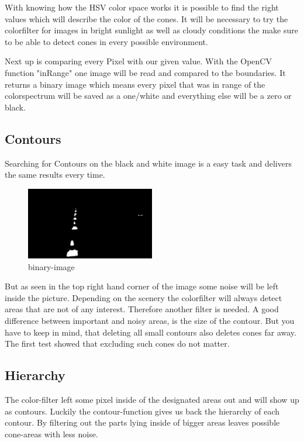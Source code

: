 \documentclass[10pt,a4paper]{article}
\begin{document}
	With knowing how the HSV color space works it is possible to find the right values which will describe the color of the cones. It will be necessary to try the colorfilter for images in bright sunlight as well as cloudy conditions the make sure to be able to detect cones in every possible environment.
	
	Next up is comparing every Pixel with our given value. With the OpenCV function "inRange" one image will be read and compared to the boundaries. It returns a binary image which means every pixel that was in range of the colorspectrum will be saved as a one/white and everything else will be a zero or black.
	
	\subsection{Contours}
	Searching for Contours on the black and white image is a easy task and delivers the same results every time.
	
	\pagebreak

	\begin{figure}[h]
		\centering
		\includegraphics[width=0.5\textwidth]{Abb/mask.png}
		\caption{binary-image}
		\label{binary-image}
	\end{figure}
	
	But as seen in the top right hand corner of the image some noise will be left inside the picture. Depending on the scenery the colorfilter will always detect areas that are not of any interest. Therefore another filter is needed. A good difference between important and noisy areas, is the size of the contour. But you have to keep in mind, that deleting all small contours also deletes cones far away. The first test showed that excluding such cones do not matter.
	
	\subsection{Hierarchy}
	The color-filter left some pixel inside of the designated areas out and will show up as contours. Luckily the contour-function gives us back the hierarchy of each contour. By filtering out the parts lying inside of bigger areas leaves possible cone-areas with less noise.
	
\end{document}
